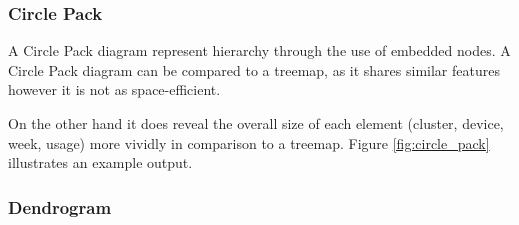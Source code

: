 \newpage
\subsubsection{Circle Pack}
A Circle Pack diagram represent hierarchy through the use of embedded nodes. 
A Circle Pack diagram can be compared to a treemap, as it shares similar 
features however it is not as space-efficient. 

On the other hand it does reveal the overall size of each element (cluster, 
device, week, usage) more vividly in comparison to a treemap. Figure 
\ref{fig:circle_pack} illustrates an example output.



\newpage
\subsubsection{Dendrogram}

